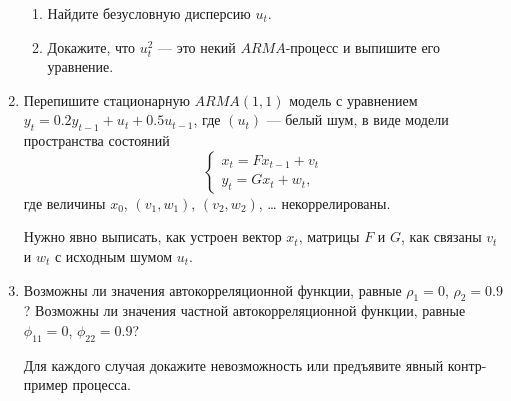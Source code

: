 \documentclass[12pt]{article}
\begin{document}
\begin{enumerate}
\begin{enumerate}
    \item Найдите безусловную дисперсию $u_t$.
    \item Докажите, что $u_t^2$ — это некий $ARMA$-процесс и выпишите его уравнение. 
\end{enumerate}


\item Перепишите стационарную $ARMA(1, 1)$ модель с уравнением $y_t = 0.2 y_{t-1} + u_t + 0.5 u_{t-1}$, 
где $(u_t)$ — белый шум, в виде модели пространства состояний
\[
\begin{cases}
    x_t = F x_{t-1} + v_t \\
    y_t = G x_t + w_t,
\end{cases}
\]
где величины $x_0$, $(v_1, w_1)$, $(v_2, w_2)$, \ldots{ } некоррелированы. 

Нужно явно выписать, как устроен вектор $x_t$, матрицы $F$ и $G$, как связаны $v_t$ и $w_t$ с исходным шумом $u_t$.


\item Возможны ли значения автокорреляционной функции, равные $\rho_1 = 0$, $\rho_2 = 0.9$?
Возможны ли значения частной автокорреляционной функции, равные $\phi_{11} = 0$, $\phi_{22} = 0.9$?

Для каждого случая докажите невозможность или предъявите явный контр-пример процесса. 

\end{enumerate}
\end{document}
